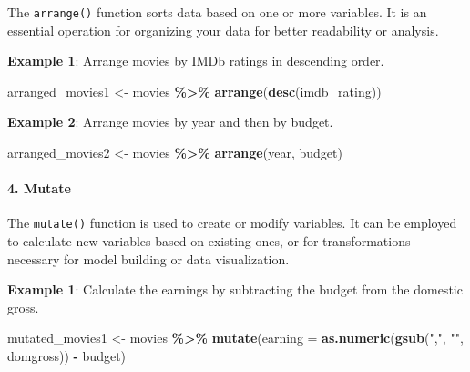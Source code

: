 \documentclass[
]{book}
\newenvironment{Shaded}{\begin{snugshade}}{\end{snugshade}}
\newcommand{\AttributeTok}[1]{\textcolor[rgb]{0.13,0.29,0.53}{#1}}
\newcommand{\FunctionTok}[1]{\textcolor[rgb]{0.13,0.29,0.53}{\textbf{#1}}}
\newcommand{\NormalTok}[1]{#1}
\newcommand{\OtherTok}[1]{\textcolor[rgb]{0.56,0.35,0.01}{#1}}
\newcommand{\SpecialCharTok}[1]{\textcolor[rgb]{0.81,0.36,0.00}{\textbf{#1}}}
\newcommand{\StringTok}[1]{\textcolor[rgb]{0.31,0.60,0.02}{#1}}
\begin{document}
The \texttt{arrange()} function sorts data based on one or more variables. It is an essential operation for organizing your data for better readability or analysis.

\textbf{Example 1}: Arrange movies by IMDb ratings in descending order.

\begin{Shaded}
\begin{Highlighting}[]
\NormalTok{arranged\_movies1 }\OtherTok{\textless{}{-}}\NormalTok{ movies }\SpecialCharTok{\%\textgreater{}\%}
  \FunctionTok{arrange}\NormalTok{(}\FunctionTok{desc}\NormalTok{(imdb\_rating))}
\end{Highlighting}
\end{Shaded}

\textbf{Example 2}: Arrange movies by year and then by budget.

\begin{Shaded}
\begin{Highlighting}[]
\NormalTok{arranged\_movies2 }\OtherTok{\textless{}{-}}\NormalTok{ movies }\SpecialCharTok{\%\textgreater{}\%}
  \FunctionTok{arrange}\NormalTok{(year, budget)}
\end{Highlighting}
\end{Shaded}

\hypertarget{mutate}{%
\paragraph*{4. Mutate}\label{mutate}}

The \texttt{mutate()} function is used to create or modify variables. It can be employed to calculate new variables based on existing ones, or for transformations necessary for model building or data visualization.

\textbf{Example 1}: Calculate the earnings by subtracting the budget from the domestic gross.

\begin{Shaded}
\begin{Highlighting}[]
\NormalTok{mutated\_movies1 }\OtherTok{\textless{}{-}}\NormalTok{ movies }\SpecialCharTok{\%\textgreater{}\%}
  \FunctionTok{mutate}\NormalTok{(}\AttributeTok{earning =} \FunctionTok{as.numeric}\NormalTok{(}\FunctionTok{gsub}\NormalTok{(}\StringTok{","}\NormalTok{, }\StringTok{""}\NormalTok{, domgross)) }\SpecialCharTok{{-}}\NormalTok{ budget)}
\end{Highlighting}
\end{Shaded}
\end{document}
